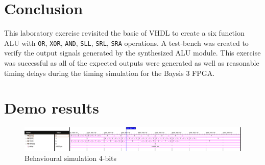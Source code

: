 \documentclass[CMPE]{../KGCOEReport}
\def\code#1{\texttt{#1}}
\begin{document}
    \section*{Conclusion}
    This laboratory exercise revisited the basic of VHDL to create a six function ALU with \code{OR}, \code{XOR},
    \code{AND}, \code{SLL}, \code{SRL}, \code{SRA} operations.
    A test-bench was created to verify the output signals generated by the synthesized ALU module.
    This exercise was successful as all of the expected outputs were generated as well as reasonable timing delays
    during the timing simulation for the Baysis 3 FPGA.

    \pagebreak
    \section*{Demo results}
    \begin{figure}[h!]
        \centering
        \includegraphics[width=\textwidth]{img/behaviour_4}
        \caption{Behavioural simulation 4-bits}
        \label{fig:demo1}
    \end{figure}
\end{document}
